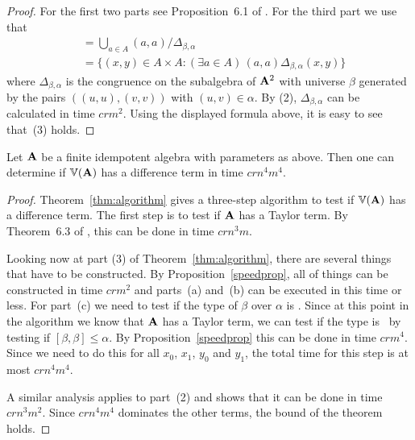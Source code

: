 \begin{proof}
For the first two parts see Proposition~6.1 of 
\cite{Freese:2009}. For the third part we use that
\begin{align*}
[\alpha, \beta]
  &= \bigcup_{a\in A} (a,a)/\Delta_{\beta,\alpha}  \\
  &= \bigl\{(x,y) \in A\times A : (\exists a \in A) \, 
  (a,a) \mathrel{\Delta_{\beta,\alpha}} (x,y)\bigr\}
\end{align*}
where $\Delta_{\beta,\alpha}$ is the congruence on the
subalgebra of $\mathbf{A}^2$ with universe $\beta$ 
generated by the pairs $((u,u), (v,v))$ with $(u,v) \in \alpha$.
By (2), $\Delta_{\beta,\alpha}$ can be calculated in time
$crm^2$. Using the displayed formula above, it is easy to see
that~(3) holds.
\end{proof}

\begin{theorem}\label{thm:time}
Let $\mathbf{A}$ be a finite idempotent algebra with parameters as
above. 
Then one can determine if $\operatorname{\mathbb{V}}(\mathbf{A})$ has a difference
term in time $crn^4m^4$.
\end{theorem}

\begin{proof}
Theorem~\ref{thm:algorithm} gives a three-step 
algorithm to test
if $\operatorname{\mathbb{V}} (\mathbf{A})$ has a difference term.
The first step is to test if $\mathbf{A}$ has a Taylor
term. By Theorem~6.3 of \cite{Freese:2009}, 
this can be done in time $crn^3m$.

Looking now at part (3) of Theorem~\ref{thm:algorithm},
there are several things that have to be constructed.
By Proposition~\ref{speedprop}, all
of things can be constructed in time $crm^2$ and 
parts~(a) and~(b) can be executed in this time or less.
For part~(c) we need to test if the type of $\beta$
over $\alpha$ is \atyp. Since at this point in the
algorithm we know that $\mathbf{A}$ has a Taylor term,
we can test if the type is \atyp\ by testing if
$[\beta,\beta] \le \alpha$. By Proposition~\ref{speedprop}
this can be done in time $crm^4$. Since we need to do
this for all $x_0$, $x_1$, $y_0$ and $y_1$, the total
time for this step is at most $crn^4m^4$. 

A similar analysis applies to part~(2) and shows that it
can be done in time $crn^3m^2$. Since $crn^4m^4$ dominates
the other terms, the bound of the theorem holds.
\end{proof}



